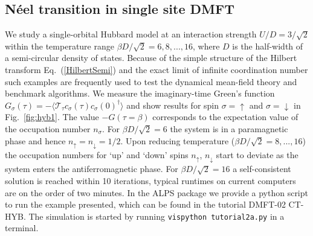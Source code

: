 \documentclass[3p,twocolumn]{elsarticle}
\begin{document}
\subsection{N\'{e}el transition in single site DMFT}
We study a single-orbital Hubbard model at an interaction strength $U/D=3 /\sqrt 2$ within the temperature range $\beta D/\sqrt 2 =6,8,...,16$, where $D$ is the half-width of a semi-circular density of states. Because of the simple structure of the Hilbert transform Eq.~(\ref{HilbertSemi}) and the exact limit of infinite coordination number such examples are frequently used to test the dynamical mean-field theory and benchmark algorithms. 
We measure the imaginary-time Green's function $G_{\sigma}(\tau)=-\langle \mathcal{T}_{\tau} c_\sigma(\tau)c_\sigma(0)^\dagger \rangle$ and show results for spin $\sigma=\uparrow$ and $\sigma=\downarrow$ in Fig.~\ref{fig:hyb1}. The value $-G(\tau = \beta)$ corresponds to the expectation value of the occupation number $n_{\sigma}$. For $\beta D/\sqrt 2 =6$ the system is in a paramagnetic phase and hence $n_\uparrow = n_\downarrow = 1/2$. Upon reducing temperature ($\beta D/\sqrt 2 =8,...,16$) the occupation numbers for `up' and `down' spins $n_\uparrow$, $n_\downarrow$ start to deviate as the system enters the antiferromagnetic phase. 
For $\beta D/\sqrt 2 =16$ a self-consistent solution is reached within 10 iterations, typical runtimes on current computers are on the order of two minutes.
In the ALPS package we provide a python script to run the example presented, which can be found in the tutorial DMFT-02 CT-HYB. The simulation is started by running \verb*#vispython tutorial2a.py# in a terminal.
\end{document}
